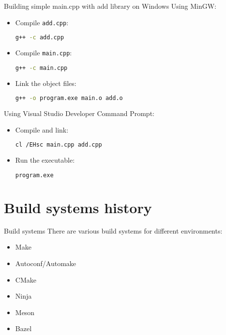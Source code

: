 \documentclass{beamer}
\begin{document}
\begin{frame}[fragile]{Building simple main.cpp with add library on Windows}
  Using MinGW:
  \begin{itemize}
    \item Compile \texttt{add.cpp}:
    \begin{lstlisting}[language=bash]
g++ -c add.cpp
    \end{lstlisting}
    \item Compile \texttt{main.cpp}:
    \begin{lstlisting}[language=bash]
g++ -c main.cpp
    \end{lstlisting}
    \item Link the object files:
    \begin{lstlisting}[language=bash]
g++ -o program.exe main.o add.o
    \end{lstlisting}
  \end{itemize}

  Using Visual Studio Developer Command Prompt:
  \begin{itemize}
    \item Compile and link:
    \begin{lstlisting}[language=bash]
cl /EHsc main.cpp add.cpp
    \end{lstlisting}
    \item Run the executable:
    \begin{lstlisting}[language=bash]
program.exe
    \end{lstlisting}
  \end{itemize}
\end{frame}

\section{Build systems history}

\begin{frame}{Build systems}
  There are various build systems for different environments:

  \begin{itemize}
    \item Make
    \item Autoconf/Automake
    \item CMake
    \item Ninja
    \item Meson
    \item Bazel
  \end{itemize}
\end{frame}
\end{document}
